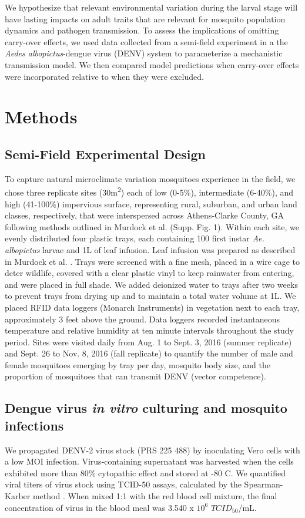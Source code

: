 \documentclass[12pt]{article}
\begin{document}
We hypothesize that relevant environmental variation during the larval stage will have lasting impacts on adult traits that are relevant for mosquito population dynamics and pathogen transmission. To assess the implications of omitting carry-over effects, we used data collected from a semi-field experiment in a the \textit{Aedes albopictus}-dengue virus (DENV) system to parameterize a mechanistic transmission model. We then compared model predictions when carry-over effects were incorporated relative to when they were excluded.

\section{Methods}
\subsection{Semi-Field Experimental Design}

To capture natural microclimate variation mosquitoes experience in the field, we chose three replicate sites (30m\textsuperscript{2}) each of low (0-5\%), intermediate (6-40\%), and high (41-100\%) impervious surface, representing rural, suburban, and urban land classes, respectively, that were interspersed across Athens-Clarke County, GA following methods outlined in Murdock et al. \citep{murdock2017} (Supp. Fig. 1). Within each site, we evenly distributed four plastic trays, each containing 100 first instar \textit{Ae. albopictus} larvae and 1L of leaf infusion. Leaf infusion was prepared as described in Murdock et al. \citep{murdock2017}. Trays were screened with a fine mesh, placed in a wire cage to deter wildlife, covered with a clear plastic vinyl to keep rainwater from entering, and were placed in full shade. We added deionized water to trays after two weeks to prevent trays from drying up and to maintain a total water volume at 1L. We placed RFID data loggers (Monarch Instruments) in vegetation next to each tray, approximately 3 feet above the ground. Data loggers recorded instantaneous temperature and relative humidity at ten minute intervals throughout the study period. Sites were visited daily from Aug. 1 to Sept. 3, 2016 (summer replicate) and Sept. 26 to Nov. 8, 2016 (fall replicate) to quantify the number of male and female mosquitoes emerging by tray per day, mosquito body size, and the proportion of mosquitoes that can transmit DENV (vector competence).

\subsection{Dengue virus \textit{in vitro} culturing and mosquito infections}
We propagated DENV-2 virus stock (PRS 225 488) by inoculating Vero cells with a low MOI infection. Virus-containing supernatant was harvested when the cells exhibited more than 80\% cytopathic effect and stored at -80 \degree C. We quantified viral titers of virus stock using TCID-50 assays, calculated by the Spearman-Karber method \citep{shao2016}. When mixed 1:1 with the red blood cell mixture, the final concentration of virus in the blood meal was 3.540 x $10^6$ $TCID_{50}$/mL.
\end{document}
